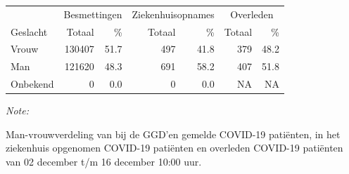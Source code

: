 \documentclass[
  english,
  man,floatsintext]{apa6}
\begin{document}
\begin{table}
\centering\begingroup\fontsize{11}{13}\selectfont

\begin{threeparttable}
\begin{tabular}{lrrrrrr}
\toprule
\multicolumn{1}{c}{ } & \multicolumn{2}{c}{Besmettingen} & \multicolumn{2}{c}{Ziekenhuisopnames} & \multicolumn{2}{c}{Overleden} \\
\cmidrule(l{3pt}r{3pt}){2-3} \cmidrule(l{3pt}r{3pt}){4-5} \cmidrule(l{3pt}r{3pt}){6-7}
Geslacht & Totaal & \% & Totaal & \% & Totaal & \%\\
\midrule
Vrouw & 130407 & 51.7 & 497 & 41.8 & 379 & 48.2\\
Man & 121620 & 48.3 & 691 & 58.2 & 407 & 51.8\\
Onbekend & 0 & 0.0 & 0 & 0.0 & NA & NA\\
\bottomrule
\end{tabular}
\begin{tablenotes}
\item \textit{Note: } 
\item Man-vrouwverdeling van bij de GGD’en gemelde COVID-19 patiënten, in het ziekenhuis opgenomen COVID-19 patiënten en overleden COVID-19 patiënten van 02 december t/m 16 december 10:00 uur.
\end{tablenotes}
\end{threeparttable}
\endgroup{}
\end{table}
\newpage
\end{document}
